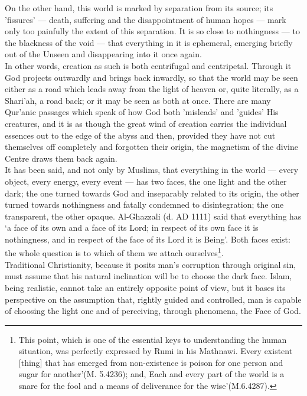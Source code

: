 \documentclass[10pt, twoside]{book}
\begin{document}
On the other hand, this world is marked by separation from its source; its 'fissures' --- death, 
suffering and the disappointment of human hopes --- mark only too painfully the extent of this 
separation. It is so close to nothingness --- to the blackness of the void --- that everything in it is 
ephemeral, emerging briefly out of the Unseen and disappearing into it once again. \\

In other words, creation as such is both centrifugal and centripetal. Through it God projects 
outwardly and brings back inwardly, so that the world may be seen either as a road which leads away 
from the light of heaven or, quite literally, as a Shari'ah, a road back; or it may be seen as both 
at once. There are many Qur'anic passages which speak of how God both 'misleads' and 'guides' His 
creatures, and it is as though the great wind of creation carries the individual essences out to the 
edge of the abyss and then, provided they have not cut themselves off completely and forgotten their 
origin, the magnetism of the divine Centre draws them back again. \\

It has been said, and not only by Muslims, that everything in the world --- every object, every energy, 
every event --- has two faces, the one light and the other dark; the one turned towards God and 
inseparably related to its origin, the other turned towards nothingness and fatally condemned to 
disintegration; the one transparent, the other opaque. Al\hyp{}Ghazzali (d. AD 1111) said that everything 
has `a face of its own and a face of its Lord; in respect of its own face it is nothingness, and in 
respect of the face of its Lord it is Being'. Both faces exist: the whole question is to which of 
them we attach ourselves\footnote{This point, which is one of the essential keys to understanding the human situation, was perfectly expressed by Rumi in his Mathnawi. Every existent [thing] that has emerged from non\hyp{}existence is poison for one person and sugar for another'(M. 5.4236); and, Each and every part of the world is a snare for the fool and a means of deliverance for the wise'(M.6.4287).}.\\

Traditional Christianity, because it posits man's corruption through original sin, must assume that 
his natural inclination will be to choose the dark face. Islam, being realistic, cannot take an 
entirely opposite point of view, but it bases its perspective on the assumption that, rightly guided 
and controlled, man is capable of choosing the light one and of perceiving, through phenomena, the 
Face of God. \\
\end{document}
